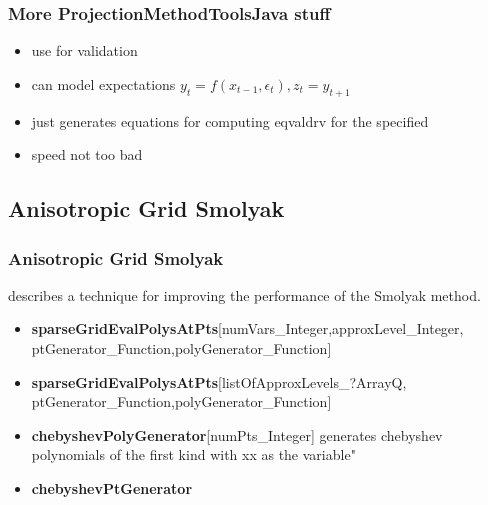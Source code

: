 \documentclass[tikz]{beamer}
\begin{document}
\begin{frame}
  \frametitle{More ProjectionMethodToolsJava stuff}
  \begin{itemize}
    \item use for validation
  \item can model expectations $y_{t}=f(x_{t-1},\epsilon_t),z_t=y_{t+1}$
  \item just generates equations for computing eqvaldrv for the specified
  \item speed not too bad
  \end{itemize}
\end{frame}




\subsection{Anisotropic Grid Smolyak}


\begin{frame}
  \frametitle{Anisotropic Grid Smolyak}
{\small
\cite{Judd2013} describes a technique for improving the performance of
the Smolyak method.
\begin{itemize}
\item {\bf sparseGridEvalPolysAtPts}[numVars\_Integer,approxLevel\_Integer,
ptGenerator\_Function,polyGenerator\_Function] 
\item {\bf sparseGridEvalPolysAtPts}[listOfApproxLevels\_?ArrayQ,
ptGenerator\_Function,polyGenerator\_Function] 
\item {\bf chebyshevPolyGenerator}[numPts\_Integer] generates chebyshev polynomials of the first kind with xx as the variable"
\item {\bf chebyshevPtGenerator}
\end{itemize}
}
\end{frame}
\end{document}
